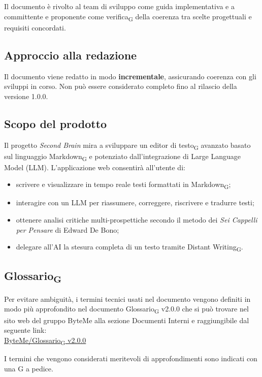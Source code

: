 \documentclass[11pt,a4paper]{article}
\newcommand{\gls}[1]{#1\textsubscript{G}}
\begin{document}
Il documento è rivolto al team di sviluppo come guida implementativa e a
committente e proponente come \gls{verifica} della coerenza tra scelte progettuali e requisiti concordati.
 
\subsection{Approccio alla redazione}
Il documento viene redatto in modo \textbf{incrementale}, assicurando coerenza con gli sviluppi in corso. Non può essere considerato completo fino al rilascio della versione 1.0.0.

\subsection{Scopo del prodotto}
Il progetto \textit{Second Brain} mira a sviluppare un \gls{editor di testo} avanzato basato sul linguaggio \gls{Markdown} e potenziato dall'integrazione di Large Language Model (LLM).
L'applicazione web consentirà all'utente di:
\begin{itemize}
  \item scrivere e visualizzare in tempo reale testi formattati in \gls{Markdown};
  \item interagire con un LLM per riassumere, correggere, riscrivere e tradurre testi;
  \item ottenere analisi critiche multi-prospettiche secondo il metodo dei \textit{Sei Cappelli per Pensare} di Edward De Bono;
  \item delegare all'AI la stesura completa di un testo tramite \gls{Distant Writing}.
\end{itemize}
 
\subsection{\gls{Glossario}}
Per evitare ambiguità, i termini tecnici usati nel documento vengono definiti in modo più approfondito nel documento \gls{Glossario} v2.0.0 che si può trovare nel sito web del gruppo ByteMe alla sezione Documenti Interni e raggiungibile dal seguente link:\\
\href{https://byteme25.github.io/ByteMe/files.html}{ByteMe/\gls{Glossario} v2.0.0}

I termini che vengono considerati meritevoli di approfondimenti sono indicati con una G a pedice.
\end{document}
